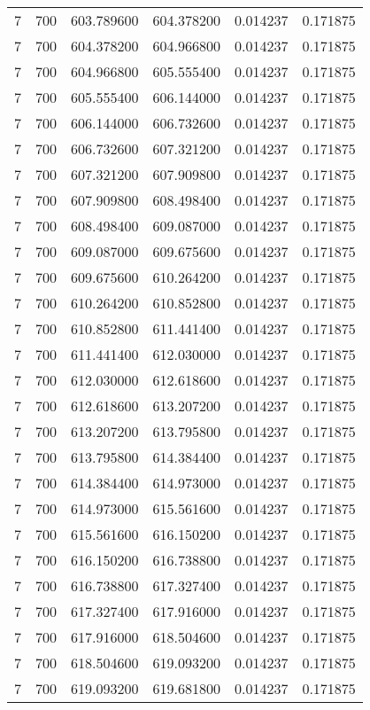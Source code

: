 \begin{longtable}{rrrrrr}
7 & 700 & 603.789600 & 604.378200 & 0.014237 & 0.171875 \\
7 & 700 & 604.378200 & 604.966800 & 0.014237 & 0.171875 \\
7 & 700 & 604.966800 & 605.555400 & 0.014237 & 0.171875 \\
7 & 700 & 605.555400 & 606.144000 & 0.014237 & 0.171875 \\
7 & 700 & 606.144000 & 606.732600 & 0.014237 & 0.171875 \\
7 & 700 & 606.732600 & 607.321200 & 0.014237 & 0.171875 \\
7 & 700 & 607.321200 & 607.909800 & 0.014237 & 0.171875 \\
7 & 700 & 607.909800 & 608.498400 & 0.014237 & 0.171875 \\
7 & 700 & 608.498400 & 609.087000 & 0.014237 & 0.171875 \\
7 & 700 & 609.087000 & 609.675600 & 0.014237 & 0.171875 \\
7 & 700 & 609.675600 & 610.264200 & 0.014237 & 0.171875 \\
7 & 700 & 610.264200 & 610.852800 & 0.014237 & 0.171875 \\
7 & 700 & 610.852800 & 611.441400 & 0.014237 & 0.171875 \\
7 & 700 & 611.441400 & 612.030000 & 0.014237 & 0.171875 \\
7 & 700 & 612.030000 & 612.618600 & 0.014237 & 0.171875 \\
7 & 700 & 612.618600 & 613.207200 & 0.014237 & 0.171875 \\
7 & 700 & 613.207200 & 613.795800 & 0.014237 & 0.171875 \\
7 & 700 & 613.795800 & 614.384400 & 0.014237 & 0.171875 \\
7 & 700 & 614.384400 & 614.973000 & 0.014237 & 0.171875 \\
7 & 700 & 614.973000 & 615.561600 & 0.014237 & 0.171875 \\
7 & 700 & 615.561600 & 616.150200 & 0.014237 & 0.171875 \\
7 & 700 & 616.150200 & 616.738800 & 0.014237 & 0.171875 \\
7 & 700 & 616.738800 & 617.327400 & 0.014237 & 0.171875 \\
7 & 700 & 617.327400 & 617.916000 & 0.014237 & 0.171875 \\
7 & 700 & 617.916000 & 618.504600 & 0.014237 & 0.171875 \\
7 & 700 & 618.504600 & 619.093200 & 0.014237 & 0.171875 \\
7 & 700 & 619.093200 & 619.681800 & 0.014237 & 0.171875 \\

\end{longtable}

